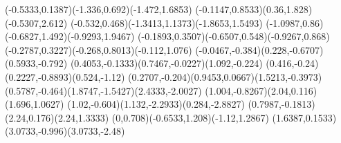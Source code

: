 {    \rcurveto(-0.5333,0.1387)(-1.336,0.692)(-1.472,1.6853)
    \rcurveto(-0.1147,0.8533)(0.36,1.828)(-0.5307,2.612)
    \rcurveto(-0.532,0.468)(-1.3413,1.1373)(-1.8653,1.5493)
    \rcurveto(-1.0987,0.86)(-0.6827,1.492)(-0.9293,1.9467)
    \rcurveto(-0.1893,0.3507)(-0.6507,0.548)(-0.9267,0.868)
    \rcurveto(-0.2787,0.3227)(-0.268,0.8013)(-0.112,1.076)
    \rcurveto(-0.0467,-0.384)(0.228,-0.6707)(0.5933,-0.792)
    \rcurveto(0.4053,-0.1333)(0.7467,-0.0227)(1.092,-0.224)
    \rcurveto(0.416,-0.24)(0.2227,-0.8893)(0.524,-1.12)
    \rcurveto(0.2707,-0.204)(0.9453,0.0667)(1.5213,-0.3973)
    \rcurveto(0.5787,-0.464)(1.8747,-1.5427)(2.4333,-2.0027)
    \rcurveto(1.004,-0.8267)(2.04,0.116)(1.696,1.0627)
    \rcurveto(1.02,-0.604)(1.132,-2.2933)(0.284,-2.8827)
    \rcurveto(0.7987,-0.1813)(2.24,0.176)(2.24,1.3333)
    \rcurveto(0,0.708)(-0.6533,1.208)(-1.12,1.2867)
    \rcurveto(1.6387,0.1533)(3.0733,-0.996)(3.0733,-2.48)
}
